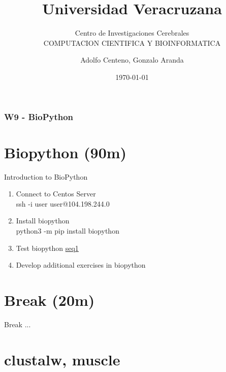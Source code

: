 \documentclass{beamer}
\begin{document}
\title{Universidad Veracruzana}  
\subtitle{Centro de Investigaciones Cerebrales\\COMPUTACION CIENTIFICA Y BIOINFORMATICA}
\author{Adolfo Centeno, Gonzalo Aranda}
\date{\today} 

\begin{frame}
\titlepage
\end{frame}

\begin{frame}\frametitle{W9 - BioPython }
\tableofcontents
\end{frame} 


\section{Biopython (90m) }

\begin{frame}

Introduction to BioPython

\begin{enumerate}

\item Connect to Centos Server \\
  ssh -i user user@104.198.244.0
\item Install biopython \\
  python3 -m pip install biopython

\item
  Test biopython \href{https://github.com/adsoftsito/python/blob/master/w9/seq1.py}{seq1} 
	
\item
  Develop additional exercises in biopython
	
\end{enumerate} 


\end{frame}


\section{Break  (20m) }

\begin{frame}


Break ...

\end{frame}


\section{clustalw, muscle }
\end{document}

